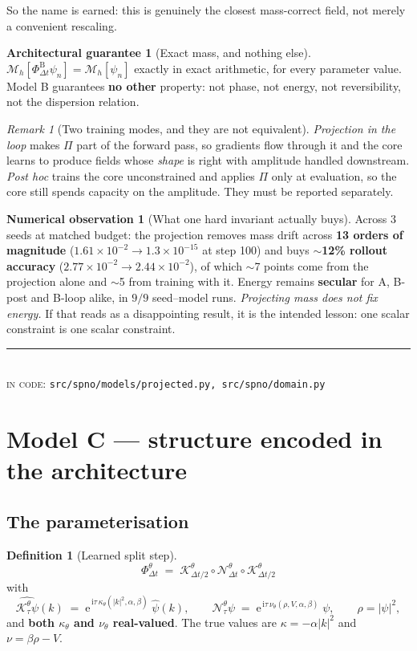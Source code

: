 \documentclass[11pt,a4paper]{article}
\theoremstyle{plain}
\theoremstyle{definition}
\newtheorem{definition}[theorem]{Definition}
\newtheorem{guarantee}[theorem]{Architectural guarantee}
\newtheorem{observation}[theorem]{Numerical observation}
\theoremstyle{remark}
\newtheorem{remark}[theorem]{Remark}
\newcommand{\iu}{\mathrm{i}}
\newcommand{\eu}{\mathrm{e}}
\newcommand{\dt}{\Delta t}
\newcommand{\Kop}{\mathcal{K}}
\newcommand{\Nop}{\mathcal{N}}
\newcommand{\Flow}{\Phi}
\newcommand{\Mass}{\mathcal{M}}
\newcommand{\src}[1]{{\color{linknavy}\texttt{\footnotesize #1}}}
\newcommand{\sourcenote}[1]{%
  \par\vspace{0.35em}\noindent
  {\footnotesize\color{rulegray}\rule{\linewidth}{0.4pt}\\[0.25em]
  \textsc{in code:} \src{#1}}\par\vspace{0.5em}}
\begin{document}
So the name is earned: this is genuinely the closest mass-correct field, not merely a
convenient rescaling.

\begin{guarantee}[Exact mass, and nothing else]
\label{guar:B}
$\Mass_h[\Flow^{\mathrm{B}}_{\dt}\psi_n] = \Mass_h[\psi_n]$ exactly in exact arithmetic,
for every parameter value. Model B guarantees \textbf{no other} property: not phase, not
energy, not reversibility, not the dispersion relation.
\end{guarantee}

\begin{remark}[Two training modes, and they are not equivalent]
\emph{Projection in the loop} makes $\Pi$ part of the forward pass, so gradients flow
through it and the core learns to produce fields whose \emph{shape} is right with
amplitude handled downstream. \emph{Post hoc} trains the core unconstrained and applies
$\Pi$ only at evaluation, so the core still spends capacity on the amplitude. They must
be reported separately.
\end{remark}

\begin{observation}[What one hard invariant actually buys]
\label{obs:B}
Across $3$ seeds at matched budget: the projection removes mass drift across
\textbf{13 orders of magnitude} ($1.61\times10^{-2}\to1.3\times10^{-15}$ at step 100) and
buys \textbf{$\sim$12\% rollout accuracy} ($2.77\times10^{-2}\to2.44\times10^{-2}$),
of which $\sim$7 points come from the projection alone and $\sim$5 from training with it.
Energy remains \textbf{secular} for A, B-post and B-loop alike, in $9/9$ seed--model runs.
\emph{Projecting mass does not fix energy.} If that reads as a disappointing result, it
is the intended lesson: one scalar constraint is one scalar constraint.
\end{observation}

\sourcenote{src/spno/models/projected.py, src/spno/domain.py}

\section{Model C --- structure encoded in the architecture}
\label{sec:learnedsplit}

\subsection{The parameterisation}

\begin{definition}[Learned split step]
\label{def:learnedsplit}
\[
\boxed{\;
\Flow^{\theta}_{\dt} \;=\; \Kop^{\theta}_{\dt/2}\circ\Nop^{\theta}_{\dt}\circ\Kop^{\theta}_{\dt/2}
\;}
\]
with
\[
\widehat{\Kop^{\theta}_{\tau}\psi}(k) \;=\; \eu^{\,\iu\tau\,\kappa_\theta(|k|^2,\alpha,\beta)}\;\widehat\psi(k),
\qquad
\Nop^{\theta}_{\tau}\psi \;=\; \eu^{\,\iu\tau\,\nu_\theta(\rho,V,\alpha,\beta)}\;\psi,
\qquad \rho=|\psi|^2,
\]
and \textbf{both $\kappa_\theta$ and $\nu_\theta$ real-valued}. The true values are
$\kappa = -\alpha|k|^2$ and $\nu = \beta\rho - V$.
\end{definition}
\end{document}
